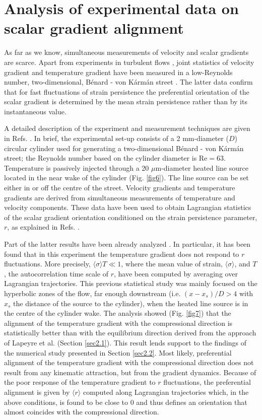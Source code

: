 \documentclass[doublespacing]{elsart}
\begin{document}
\section{Analysis of experimental data on scalar gradient alignment}
\label{sec4}
As far as 
we know, simultaneous measurements of velocity and scalar 
gradients are scarce.
Apart from experiments in turbulent flows
\cite{Gal04}, 
joint statistics of velocity gradient and temperature
gradient have been measured in a low-Reynolds number,
two-dimensional, B\'enard - von K\'arm\'an street
\cite{G01,Gal02}.
The latter data confirm
that for fast fluctuations of strain persistence
the preferential orientation of the scalar gradient
is determined by the mean strain persistence rather
than by its instantaneous value.

A detailed description of the experiment 
and measurement techniques are given 
in Refs. \cite{G01,Gal02,Pal04}.
In brief, 
the experimental set-up consists of a 
2 mm-diameter ($ D $) circular cylinder used for generating
a two-dimensional B\'enard - von K\'arm\'an street;
the Reynolds number based on the cylinder diameter is
$ \mbox{Re} = 63 $.
Temperature is passively injected through a 20 $ \mu$m-diameter
heated
line source located in the near wake of the cylinder
(Fig. \ref{fig6}).
The line source can be set 
either in or off the centre of the street.
Velocity gradients and temperature gradients 
are
derived from simultaneous measurements of temperature
and velocity components.
These data have been used to  
obtain
Lagrangian statistics of the 
scalar gradient orientation 
conditioned on the strain persistence parameter, $ r $, 
as explained in Refs. \cite{G06,Gal05}.

Part of the latter results have been 
already
analyzed
\cite{G06,Gal05}.
In particular, it has been found that in this experiment 
the temperature gradient does not respond to $ r $
fluctuations. More precisely, 
$ \langle \sigma \rangle T \ll 1 $,
where the mean value of strain, $ \langle \sigma \rangle $,
and $ T $, the autocorrelation time scale of $ r $,
have been computed by averaging over Lagrangian trajectories. 
This previous statistical study was mainly focused on
the hyperbolic zones of the flow,
far enough downstream (i.e. $ (x-x_s)/D > 4 $
with $ x_s $ the distance of the source to the cylinder),
when the
heated
line source is in the centre of the cylinder wake.
The analysis
showed (Fig. \ref{fig7}) that 
the 
alignment of the temperature gradient with the 
compressional direction is statistically better than
with the equilibrium direction derived from the
approach of Lapeyre et al. \cite{Lal99} (Section \ref{sec2.1}).
This result lends support to the findings of the
numerical study presented in Section \ref{sec2.2}.
Most likely,
preferential alignment of the
temperature gradient with the compressional direction 
does not result from any kinematic attraction,
but from the gradient dynamics.
Because of the poor response of the temperature
gradient to $ r $ fluctuations, the preferential
alignment 
is given by $ \langle r \rangle $
computed along Lagrangian trajectories
which, in the above conditions, is found to be close to 0
and thus defines an orientation that almost coincides with
the compressional direction.
\end{document}

